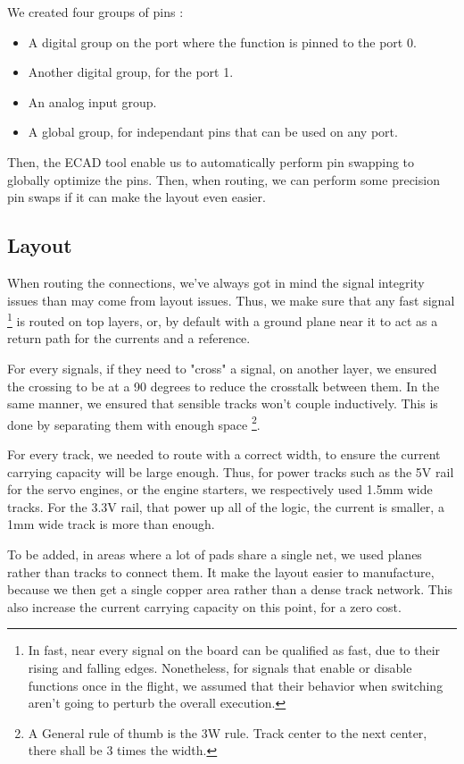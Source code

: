 We created four groups of pins :
\begin{itemize}[noitemsep]
    \item   A digital group on the port where the function is pinned to the port 0.
    \item   Another digital group, for the port 1.
    \item   An analog input group.
    \item   A global group, for independant pins that can be used on any port.
\end{itemize}

Then, the ECAD tool enable us to automatically perform pin swapping to globally
optimize the pins. Then, when routing, we can perform some precision pin swaps
if it can make the layout even easier.

\subsection{Layout}
When routing the connections, we've always got in mind the signal integrity
issues than may come from layout issues. Thus, we make sure that any fast
signal \footnote{ In fast, near every signal on the board can be qualified as
    fast, due to their rising and falling edges. Nonetheless, for signals that
    enable or disable functions once in the flight, we assumed that their behavior
    when switching aren't going to perturb the overall execution. } is routed on
top layers, or, by default with a ground plane near it to act as a return path
for the currents and a reference.

For every signals, if they need to "cross" a signal, on another layer, we
ensured the crossing to be at a 90 degrees to reduce the crosstalk between
them. In the same manner, we ensured that sensible tracks won't couple
inductively. This is done by separating them with enough space \footnote{A
    General rule of thumb is the 3W rule. Track center to the next center, there
    shall be 3 times the width. }.

For every track, we needed to route with a correct width, to ensure the current
carrying capacity will be large enough. Thus, for power tracks such as the 5V
rail for the servo engines, or the engine starters, we respectively used 1.5mm
wide tracks. For the 3.3V rail, that power up all of the logic, the current is
smaller, a 1mm wide track is more than enough.

To be added, in areas where a lot of pads share a single net, we used planes
rather than tracks to connect them. It make the layout easier to manufacture,
because we then get a single copper area rather than a dense track network.
This also increase the current carrying capacity on this point, for a zero
cost.

